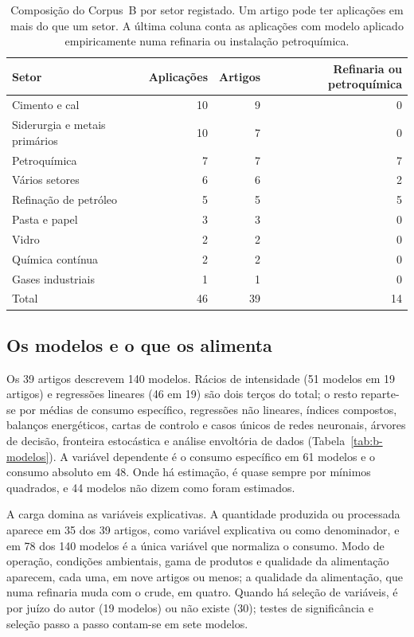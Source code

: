 \begin{table}[htbp]
  \centering
  \caption[Composição do Corpus B por setor]{Composição do Corpus~B por
  setor registado. Um artigo pode ter aplicações em mais do que um setor.
  A última coluna conta as aplicações com modelo aplicado empiricamente numa
  refinaria ou instalação petroquímica.}
  \label{tab:b-composicao}
  \begin{tabular}{lrrr}
    \toprule
    Setor & Aplicações & Artigos & Refinaria ou petroquímica \\
    \midrule
    Cimento e cal & 10 & 9 & 0 \\
    Siderurgia e metais primários & 10 & 7 & 0 \\
    Petroquímica & 7 & 7 & 7 \\
    Vários setores & 6 & 6 & 2 \\
    Refinação de petróleo & 5 & 5 & 5 \\
    Pasta e papel & 3 & 3 & 0 \\
    Vidro & 2 & 2 & 0 \\
    Química contínua & 2 & 2 & 0 \\
    Gases industriais & 1 & 1 & 0 \\
    \midrule
    Total & 46 & 39 & 14 \\
    \bottomrule
  \end{tabular}
\end{table}

\subsection{Os modelos e o que os alimenta}

Os 39 artigos descrevem 140 modelos. Rácios de intensidade (51 modelos em
19 artigos) e regressões lineares (46 em 19) são dois terços do total; o
resto reparte-se por médias de consumo específico, regressões não lineares,
índices compostos, balanços energéticos, cartas de controlo e casos únicos
de redes neuronais, árvores de decisão, fronteira estocástica e análise
envoltória de dados (Tabela~\ref{tab:b-modelos}). A variável dependente é o
consumo específico em 61 modelos e o consumo absoluto em 48. Onde há
estimação, é quase sempre por mínimos quadrados, e 44 modelos não dizem como
foram estimados.

A carga domina as variáveis explicativas. A quantidade produzida ou
processada aparece em 35 dos 39 artigos, como variável explicativa ou como
denominador, e em 78 dos 140 modelos é a única variável que normaliza o
consumo. Modo de operação, condições ambientais, gama de produtos e
qualidade da alimentação aparecem, cada uma, em nove artigos ou menos; a
qualidade da alimentação, que numa refinaria muda com o crude, em quatro.
Quando há seleção de variáveis, é por juízo do autor (19 modelos) ou não
existe (30); testes de significância e seleção passo a passo contam-se em
sete modelos.

